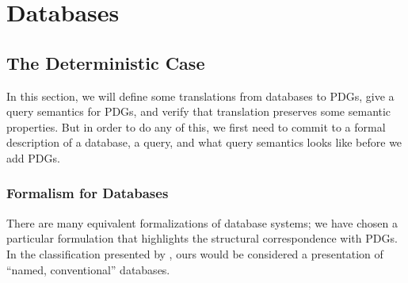 \documentclass[the-pdg-manual.tex]{subfiles}
\begin{document}
	\section{Databases}
    
	\subsection{The Deterministic Case}
	
	In this section, we will define some translations from databases to PDGs,
	give a query semantics for PDGs, and verify that translation preserves some semantic properties. 
	But in order to do any of this, we first need to commit to a formal description of a database, a query, and what query semantics looks like before we add PDGs. 
	\subsubsection{Formalism for Databases}
	There are many equivalent formalizations of database systems; we have chosen a 
	particular formulation that highlights the structural correspondence with PDGs.
	In the classification presented by \cite[\S3.3]{abiteboul1995foundations}, ours 
	would be considered a presentation of ``named, conventional'' databases.
	
\end{document}
